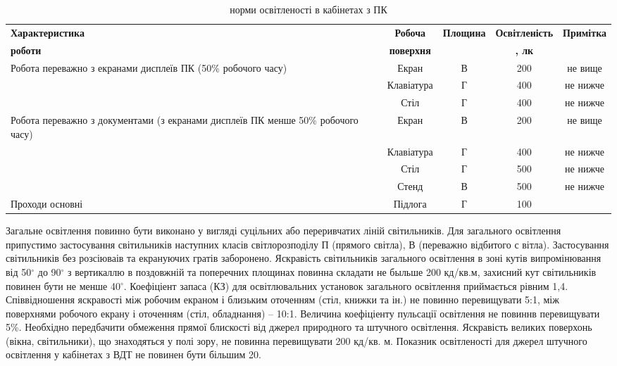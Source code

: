 \begin{table}
\centering
\begin{tabular}[c]{|p{5cm}|c|c|c|c|}
\hline
\bfseries Характеристика & \bfseries Робоча & \bfseries Площина & \bfseries Освітленість& \bfseries Примітка \\ 
\bfseries роботи         & \bfseries поверхня & &\bfseries , лк  & \\

\hline
Робота переважно з екранами дисплеїв ПК (50\% робочого часу)
& Екран & В & 200 & не вище \\ 
& Клавіатура & Г & 400 & не нижче \\ 
& Стіл & Г & 400 & не нижче \\ 

\hline
Робота переважно з документами (з екранами дисплеїв ПК менше 50\% робочого часу)
& Екран & В & 200 & не вище \\ 
& Клавіатура & Г & 400 & не нижче \\ 
& Стіл & Г & 500 & не нижче \\ 
& Стенд & В & 500 & не нижче \\ 

\hline
Проходи основні & Підлога & Г & 100 & \\
\hline
\end{tabular}
\caption{норми освітленості в кабінетах з ПК}
\label{tab:labour protection}
\end{table} 

Загальне освітлення повинно бути виконано у вигляді суцільних або переривчатих  ліній світильників. Для загального освітлення припустимо застосування світильників наступних класів світлорозподілу П (прямого світла), В (переважно  відбитого с вітла).  Застосування   світильників   без   розсіюваів   та екрануючих гратів заборонено. Яскравість світильників загального освітлення в зоні кутів випромінювання від 50$^{\circ}$ до 90$^{\circ}$ з вертикаллю в поздовжній та поперечних площинах повинна складати не быльше 200 кд/кв.м, захисний кут світильників повинен бути не менше 40$^{\circ}$. Коефіціент запаса (КЗ) для освітлювальних установок загального освітлення приймається рівним 1,4. Співвідношення яскравості між робочим екраном і близьким оточенням (стіл, книжки та ін.) не повинно перевищувати 5:1, між поверхнями робочого екрану і оточенням (стіл, обладнання) – 10:1. Величина коефіціенту пульсації освітлення не повиннв перевищувати 5\%. Необхідно передбачити обмеження прямої блискості від джерел природного та штучного освітлення. Яскравість великих поверхонь (вікна, світильники), що знаходяться у полі зору, не повинна перевищувати 200 кд/кв. м. Показник освітленості для джерел штучного освітлення у кабінетах з ВДТ не повинен бути більшим 20.

